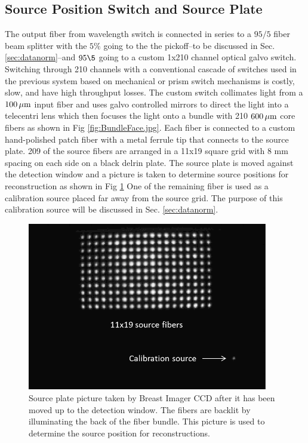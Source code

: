 \subsection{Source Position Switch and Source Plate}
The output fiber from wavelength switch is connected in series to a $95/5$ fiber beam splitter with the $5\%$ going to the the pickoff--to be discussed in Sec. \ref{sec:datanorm}--and $95\5$ going to a custom 1x210 channel optical galvo switch. Switching through 210 channels with a conventional cascade of switches used in the previous system based on mechanical or prism switch mechanisms is costly, slow, and have high throughput losses. The custom switch collimates light from a $100\,\mu{\rm m}$ input fiber and uses galvo controlled mirrors to direct the light into a telecentri lens which then focuses the light onto a bundle with 210 $600\,\mu{\rm m}$ core fibers as shown in Fig \ref{fig:BundleFace.jpg}. Each fiber is connected to a custom hand-polished patch fiber with a metal ferrule tip that connects to the source plate. 209 of the source fibers are arranged in a 11x19 square grid with 8 mm spacing on each side on a black delrin plate. The source plate is moved against the detection window and a picture is taken to determine source positions for reconstruction as shown in Fig \ref{fig:srcplatepic} One of the remaining fiber is used as a calibration source placed far away from the source grid. The purpose of this calibration source will be discussed in Sec. \ref{sec:datanorm}.


\begin{figure}[ht]
\begin{center}
\includegraphics[width=10.5cm]{./figures/4_Gen3/srcplatepic2.png}
\caption{Source plate picture taken by Breast Imager CCD after it has been moved up to the detection window. The fibers are backlit by illuminating the back of the fiber bundle. This picture is used to determine the source position for reconstructions.}
\label{fig:srcplatepic}
\end{center}
\end{figure}


